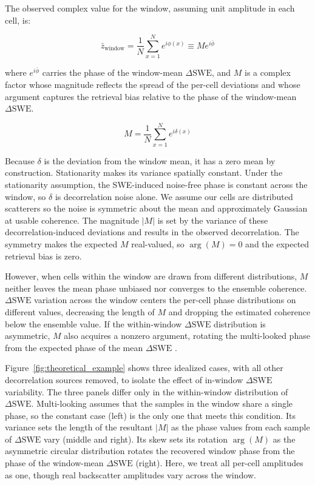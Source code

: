 \documentclass[tc, manuscript]{copernicus}
\begin{document}
\noindent The observed complex value for the window, assuming unit amplitude in each cell, is:

\begin{equation}\label{eq:z_window}
    \bar{z}_{\mathrm{window}}
      = \frac{1}{N} \sum_{x=1}^{N} e^{i\phi(x)}
      \equiv M e^{i\bar{\phi}}
\end{equation}

\noindent where $e^{i\bar{\phi}}$ carries the phase of the window-mean $\Delta\mathrm{SWE}$, and $M$ is a complex factor whose magnitude reflects the spread of the per-cell deviations and whose argument captures the retrieval bias relative to the phase of the window-mean $\Delta\mathrm{SWE}$.

\begin{equation}\label{eq:def_m}
    M = \frac{1}{N} \sum_{x=1}^{N} e^{i\delta(x)}
\end{equation}

Because $\delta$ is the deviation from the window mean, it has a zero mean by construction. Stationarity makes its variance spatially constant. Under the stationarity assumption, the SWE-induced noise-free phase is constant across the window, so $\delta$ is decorrelation noise alone. We assume our cells are distributed scatterers so the noise is symmetric about the mean and approximately Gaussian at usable coherence. The magnitude $|M|$ is set by the variance of these decorrelation-induced deviations and results in the observed decorrelation. The symmetry makes the expected $M$ real-valued, so $\arg(M)=0$ and the expected retrieval bias is zero.

However, when cells within the window are drawn from different distributions, $M$ neither leaves the mean phase unbiased nor converges to the ensemble coherence. $\Delta\mathrm{SWE}$ variation across the window centers the per-cell phase distributions on different values, decreasing the length of $M$ and dropping the estimated coherence below the ensemble value. If the within-window $\Delta\mathrm{SWE}$ distribution is asymmetric, $M$ also acquires a nonzero argument, rotating the multi-looked phase from the expected phase of the mean $\Delta\mathrm{SWE}$ \citep{fischer1993}.

Figure~\ref{fig:theoretical_example} shows three idealized cases, with all other decorrelation sources removed, to isolate the effect of in-window $\Delta\mathrm{SWE}$ variability. The three panels differ only in the within-window distribution of $\Delta\mathrm{SWE}$. Multi-looking assumes that the samples in the window share a single phase, so the constant case (left) is the only one that meets this condition. Its variance sets the length of the resultant $|M|$ as the phase values from each sample of $\Delta\mathrm{SWE}$ vary (middle and right). Its skew sets its rotation $\arg(M)$ as the asymmetric circular distribution rotates the recovered window phase from the phase of the window-mean $\Delta\mathrm{SWE}$ (right). Here, we treat all per-cell amplitudes as one, though real backscatter amplitudes vary across the window.
\end{document}
